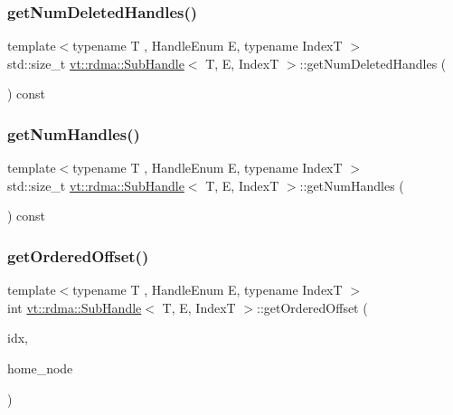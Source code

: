 \mbox{\label{structvt_1_1rdma_1_1_sub_handle_a8760602e62b5ae6c83b32547570f57d5}} 
\subsubsection{\texorpdfstring{get\+Num\+Deleted\+Handles()}{getNumDeletedHandles()}}
{\footnotesize\ttfamily template$<$typename T , Handle\+Enum E, typename IndexT $>$ \\
std\+::size\+\_\+t \hyperlink{structvt_1_1rdma_1_1_sub_handle}{vt\+::rdma\+::\+Sub\+Handle}$<$ T, E, IndexT $>$\+::get\+Num\+Deleted\+Handles (\begin{DoxyParamCaption}{ }\end{DoxyParamCaption}) const}

\mbox{\label{structvt_1_1rdma_1_1_sub_handle_a85f238c6e5722b6e9ad9c2eff7c9463f}} 
\subsubsection{\texorpdfstring{get\+Num\+Handles()}{getNumHandles()}}
{\footnotesize\ttfamily template$<$typename T , Handle\+Enum E, typename IndexT $>$ \\
std\+::size\+\_\+t \hyperlink{structvt_1_1rdma_1_1_sub_handle}{vt\+::rdma\+::\+Sub\+Handle}$<$ T, E, IndexT $>$\+::get\+Num\+Handles (\begin{DoxyParamCaption}{ }\end{DoxyParamCaption}) const}

\mbox{\label{structvt_1_1rdma_1_1_sub_handle_a739742d5f2e5d5efda43eeb57072c031}} 
\subsubsection{\texorpdfstring{get\+Ordered\+Offset()}{getOrderedOffset()}}
{\footnotesize\ttfamily template$<$typename T , Handle\+Enum E, typename IndexT $>$ \\
int \hyperlink{structvt_1_1rdma_1_1_sub_handle}{vt\+::rdma\+::\+Sub\+Handle}$<$ T, E, IndexT $>$\+::get\+Ordered\+Offset (\begin{DoxyParamCaption}\item[{IndexT}]{idx,  }\item[{\hyperlink{namespacevt_a866da9d0efc19c0a1ce79e9e492f47e2}{Node\+Type}}]{home\+\_\+node }\end{DoxyParamCaption})}

